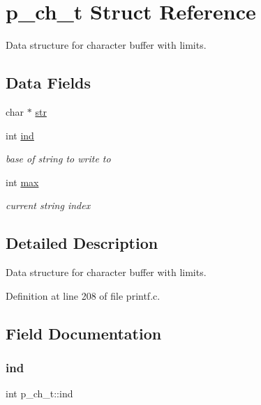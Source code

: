 \hypertarget{structp__ch__t}{}\section{p\+\_\+ch\+\_\+t Struct Reference}
\label{structp__ch__t}


Data structure for character buffer with limits.  


\subsection*{Data Fields}
\begin{DoxyCompactItemize}
\item 
char $\ast$ \hyperlink{structp__ch__t_aa3c8616342a2717bc714bf1b6d00516f}{str}
\item 
int \hyperlink{structp__ch__t_a9d6834d749cd9232a16cb20b598fe90d}{ind}
\begin{DoxyCompactList}\small\item\em base of string to write to \end{DoxyCompactList}\item 
int \hyperlink{structp__ch__t_a0dee9f28e498d427e53051b7e1846d34}{max}
\begin{DoxyCompactList}\small\item\em current string index \end{DoxyCompactList}\end{DoxyCompactItemize}


\subsection{Detailed Description}
Data structure for character buffer with limits. 

Definition at line 208 of file printf.\+c.



\subsection{Field Documentation}
\mbox{\label{structp__ch__t_a9d6834d749cd9232a16cb20b598fe90d}} 
\subsubsection{\texorpdfstring{ind}{ind}}
{\footnotesize\ttfamily int p\+\_\+ch\+\_\+t\+::ind}



